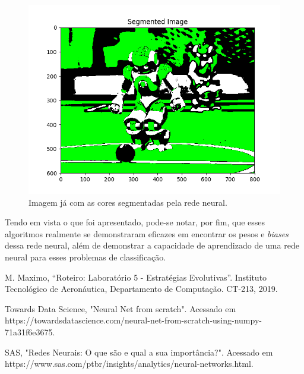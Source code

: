 \documentclass[conference]{IEEEtran}
\begin{document}
\begin{figure}[htbp]
\centering
\centerline{\includegraphics[scale=0.5]{imagens/color_segmentation/segmented_image.png}}
\caption{Imagem já com as cores segmentadas pela rede neural.}
\label{color_segmentation/segmented_image}
\end{figure} 

Tendo em vista o que foi apresentado, pode-se notar, por fim, que esses algoritmos realmente se demonstraram eficazes em encontrar os pesos e \textit{biases} dessa rede neural, além de demonstrar a capacidade de aprendizado de uma rede neural para esses problemas de classificação.

\begin{thebibliography}{00}
 M. Maximo, ``Roteiro: Laboratório 5 - Estratégias Evolutivas''. Instituto Tecnológico de Aeronáutica, Departamento de Computação. CT-213, 2019.

 Towards Data Science, "Neural Net from scratch". Acessado em https://towardsdatascience.com/neural-net-from-scratch-using-numpy-71a31f6e3675.

 SAS, "Redes Neurais: O que são e qual a sua importância?". Acessado em https://www.sas.com/pt\underline{\space}br/insights/analytics/neural-networks.html.

\end{thebibliography}
\end{document}
